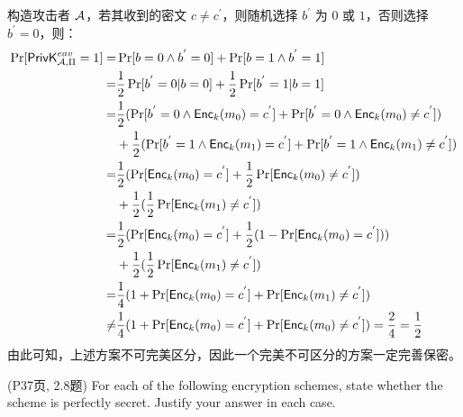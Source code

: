 \begin{questions}
\begin{solution}
\begin{equation}
            \end{equation}
            构造攻击者 $\mathcal{A}$，若其收到的密文 $c\neq{c^{'}}$，则随机选择 $b^{'}$ 为 $0$ 或 $1$，否则选择 $b^{'}=0$，则：
            \begin{equation}
                \begin{aligned}
                    \Pr[\mathsf{PrivK}^{eav}_{\mathcal{A},\Pi}=1]=&\Pr[b=0\wedge{b}^{'}=0]+\Pr[b=1\wedge{b}^{'}=1]\\
                    =&\frac{1}{2}\Pr[{b}^{'}=0|b=0]+\frac{1}{2}\Pr[{b}^{'}=1|b=1]\\
                    =&\frac{1}{2}(\Pr[{b}^{'}=0\wedge\mathsf{Enc}_k(m_0)={c^{'}}]+\Pr[{b}^{'}=0\wedge\mathsf{Enc}_k(m_0)\neq{c^{'}}])\\
                    &+\frac{1}{2}(\Pr[{b}^{'}=1\wedge\mathsf{Enc}_k(m_1)={c^{'}}]+\Pr[{b}^{'}=1\wedge\mathsf{Enc}_k(m_1)\neq{c^{'}}])\\
                    =&\frac{1}{2}(\Pr[\mathsf{Enc}_k(m_0)=c^{'}]+\frac{1}{2}\Pr[\mathsf{Enc}_k(m_0)\neq{c^{'}}])\\
                    &+\frac{1}{2}(\frac{1}{2}\Pr[\mathsf{Enc}_k(m_1)\neq{c^{'}}])\\
                    =&\frac{1}{2}(\Pr[\mathsf{Enc}_k(m_0)=c^{'}]+\frac{1}{2}(1-\Pr[\mathsf{Enc}_k(m_0)=c^{'}]))\\
                    &+\frac{1}{2}(\frac{1}{2}\Pr[\mathsf{Enc}_k(m_1)\neq{c^{'}}])\\
                    =&\frac{1}{4}(1+\Pr[\mathsf{Enc}_k(m_0)=c^{'}]+\Pr[\mathsf{Enc}_k(m_1)\neq{c^{'}}])\\
                    \neq&\frac{1}{4}(1+\Pr[\mathsf{Enc}_k(m_0)=c^{'}]+\Pr[\mathsf{Enc}_k(m_0)\neq{c^{'}}])=\frac{2}{4}=\frac{1}{2}
                \end{aligned}
            \end{equation}
            由此可知，上述方案不可完美区分，因此一个完美不可区分的方案一定完善保密。
        \end{solution}

    \question (P37页, 2.8题) For each of the following encryption schemes, state whether the scheme is perfectly secret. Justify your answer in each case.
\end{questions}
